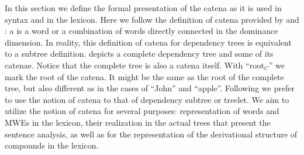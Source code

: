 \documentclass[output=paper,colorlinks,citecolor=brown]{langscibook}
\begin{document}
In this section we define the formal presentation of the catena as it is used in syntax and in the lexicon. Here we follow the definition of catena provided by \citet{OGrady} and \citet{gross-2010-chains}: a  is a word or a combination of words directly connected in the dominance dimension. In reality, this definition of catena for dependency trees is equivalent to a subtree definition.  depicts a complete dependency tree and some of its catenae. Notice that the complete tree is also a catena itself. With ``root$_C$'' we mark the root of the catena. It might be the same as the root of the complete tree, but also different as in the cases of ``John'' and ``apple''. Following \citet{Osborne-et.-al-2012} we prefer to use the notion of catena to that of dependency subtree or treelet. We aim to utilize the notion of catena for several purposes: representation of words and MWEs in the lexicon, their realization in the actual trees that present the sentence analysis, as well as for the representation of the derivational structure of compounds in the lexicon.
\end{document}
